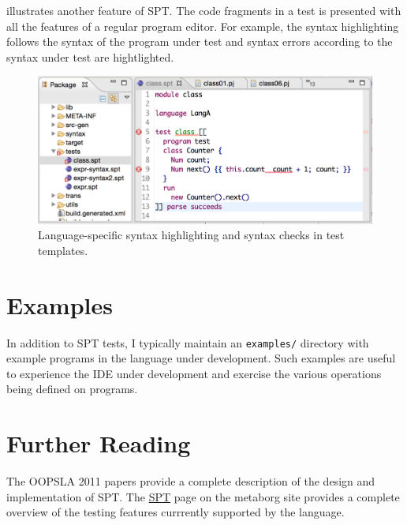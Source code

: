  illustrates another feature of SPT. The code fragments
in a test is presented with all the features of a regular program editor.
For example, the syntax highlighting follows the syntax of the program under
test and syntax errors according to the syntax under test are hightlighted.

\begin{figure}[t]
\includegraphics[width=\hsize]{tests/class-spt.pdf}
\caption{Language-specific syntax highlighting and syntax checks in test
templates.}
\end{figure}


\section{Examples}

In addition to SPT tests, I typically maintain an \texttt{examples/} directory
with example programs in the language under development. Such examples are
useful to experience the IDE under development and exercise the various
operations being defined on programs.

\section{Further Reading}

The OOPSLA 2011 papers \cite{KatsVV11,KatsVV11a} provide a complete description
of the design and implementation of SPT.
The \href{http://metaborg.org/spt/}{SPT} page on the metaborg site provides a
complete overview of the testing features currrently supported by the
language.


